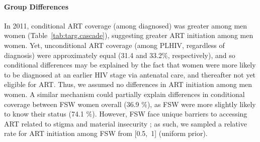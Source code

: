 \paragraph{Group Differences}
In 2011, conditional ART coverage (among diagnosed) was greater among men \vs women
(Table~\ref{tab:targ.cascade}),
suggesting greater ART initiation among men \vs women.
Yet, unconditional ART coverage (among PLHIV, regardless of diagnosis)
were approximately equal (31.4 and 33.2\%, respectively),
and so conditional differences may be explained by the fact that
women were more likely to be diagnosed at an earlier HIV stage via antenatal care,
and thereafter not yet eligible for ART.
Thus, we assumed no differences in ART initiation among men \vs women.
A similar mechanism could partially explain
differences in conditional coverage between FSW \vs women overall (36.9 \%),
as FSW were more slightly likely to know their status (74.1 \%).
However, FSW face unique barriers to accessing ART
related to stigma and material insecurity \cite{Lancaster2016sr};
as such, we sampled a relative rate for ART initiation among FSW from [0.5,~1] (uniform prior).
